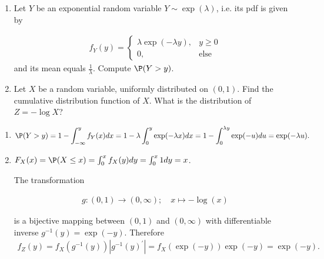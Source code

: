 
\begin{exercise}

\phantom{}

\begin{enumerate}[label = (\alph*)]
  \item Let $Y$ be an exponential random variable $Y \sim \exp(\lambda)$, i.e.
  its pdf is given by

  \begin{align*}
    f_Y(y) = \begin{cases}
      \lambda\exp(-\lambda y), & y \geq 0 \\
      0, & \text{else}
    \end{cases}
  \end{align*}
  and its mean equals $\frac{1}{\lambda}$. Compute $\P(Y > y)$.

  \item Let $X$ be a random variable, uniformly distributed on $(0,1)$.
  Find the cumulative distribution function of $X$. What is the distribution of
  $Z = - \log X$?
\end{enumerate}

\end{exercise}


\begin{solution}

\phantom{}

\begin{enumerate}[label = (\alph*)]
  \item
  \begin{align*}
    \P(Y > y) = 1 - \int_{-\infty}^{y} f_Y(x) dx =
    1 - \lambda \int_{0}^{y} \exp(-\lambda x) dx =
    1 - \int_{0}^{\lambda y} \exp(-u) du = \exp( - \lambda u).
  \end{align*}

  \item $F_X(x) = \P(X \leq x) = \int_0^x f_X(y) dy = \int_0^x 1 dy = x$.

  The transformation

  \begin{align*}
    g: (0,1) \to (0, \infty); \quad x \mapsto -\log(x)
  \end{align*}

  is a bijective mapping between $(0,1)$ and $(0,\infty)$ with differentiable
  inverse $g^{-1}(y) = \exp(-y)$. Therefore
  \begin{align*}
    f_Z(y) = f_X(g^{-1}(y))|g^{-1}(y)^{\prime}|
    = f_X(\exp(-y))\exp(-y) = \exp(-y).
  \end{align*}

\end{enumerate}

\end{solution}

